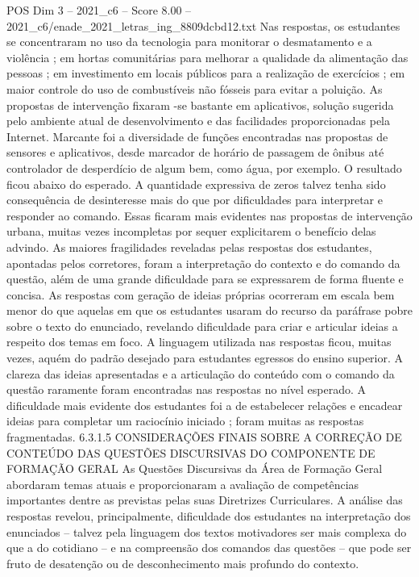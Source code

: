 \begin{textsample}{POS Dim 3 – 2021\_c6 – Score 8.00 – 2021\_c6/enade\_2021\_letras\_ing\_8809dcbd12.txt}
Nas respostas, os estudantes se concentraram no uso da tecnologia para monitorar o desmatamento e a violência ; em hortas comunitárias para melhorar a qualidade da alimentação das pessoas ; em investimento em locais públicos para a realização de exercícios ; em maior controle do uso de combustíveis não fósseis para evitar a poluição.
As propostas de intervenção fixaram -se bastante em aplicativos, solução sugerida pelo ambiente atual de desenvolvimento e das facilidades proporcionadas pela Internet.
Marcante foi a diversidade de funções encontradas nas propostas de sensores e aplicativos, desde marcador de horário de passagem de ônibus até controlador de desperdício de algum bem, como água, por exemplo.
O resultado ficou abaixo do esperado.
A quantidade expressiva de zeros talvez tenha sido consequência de desinteresse mais do que por dificuldades para interpretar e responder ao comando.
Essas ficaram mais evidentes nas propostas de intervenção urbana, muitas vezes incompletas por sequer explicitarem o benefício delas advindo.
As maiores fragilidades reveladas pelas respostas dos estudantes, apontadas pelos corretores, foram a interpretação do contexto e do comando da questão, além de uma grande dificuldade para se expressarem de forma fluente e concisa.
As respostas com geração de ideias próprias ocorreram em escala bem menor do que aquelas em que os estudantes usaram do recurso da paráfrase pobre sobre o texto do enunciado, revelando dificuldade para criar e articular ideias a respeito dos temas em foco.
A linguagem utilizada nas respostas ficou, muitas vezes, aquém do padrão desejado para estudantes egressos do ensino superior.
A clareza das ideias apresentadas e a articulação do conteúdo com o comando da questão raramente foram encontradas nas respostas no nível esperado.
A dificuldade mais evidente dos estudantes foi a de estabelecer relações e encadear ideias para completar um raciocínio iniciado ; foram muitas as respostas fragmentadas. 6.3.1.5 CONSIDERAÇÕES FINAIS SOBRE A CORREÇÃO DE CONTEÚDO DAS QUESTÕES DISCURSIVAS DO COMPONENTE DE FORMAÇÃO GERAL As Questões Discursivas da Área de Formação Geral abordaram temas atuais e proporcionaram a avaliação de competências importantes dentre as previstas pelas suas Diretrizes Curriculares.
A análise das respostas revelou, principalmente, dificuldade dos estudantes na interpretação dos enunciados – talvez pela linguagem dos textos motivadores ser mais complexa do que a do cotidiano – e na compreensão dos comandos das questões – que pode ser fruto de desatenção ou de desconhecimento mais profundo do contexto.

\end{textsample}

